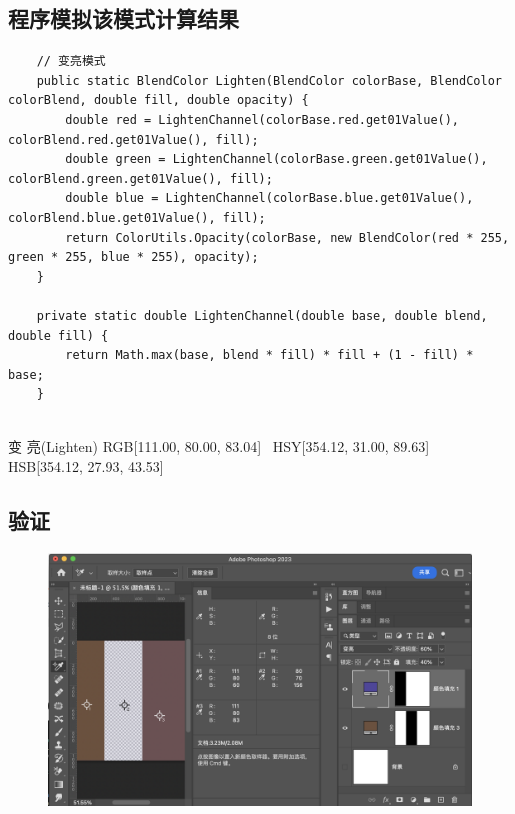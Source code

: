 \subsection{ 程序模拟该模式计算结果}

\begin{lstlisting}
	// 变亮模式
	public static BlendColor Lighten(BlendColor colorBase, BlendColor colorBlend, double fill, double opacity) {
		double red = LightenChannel(colorBase.red.get01Value(), colorBlend.red.get01Value(), fill);
		double green = LightenChannel(colorBase.green.get01Value(), colorBlend.green.get01Value(), fill);
		double blue = LightenChannel(colorBase.blue.get01Value(), colorBlend.blue.get01Value(), fill);
		return ColorUtils.Opacity(colorBase, new BlendColor(red * 255, green * 255, blue * 255), opacity);
	}
	
	private static double LightenChannel(double base, double blend, double fill) {
		return Math.max(base, blend * fill) * fill + (1 - fill) * base;
	}
	
\end{lstlisting}


\begin{result}
\item 变    亮(Lighten)       RGB[111.00,  80.00,  83.04]~ HSY[354.12,  31.00,  89.63]~ HSB[354.12,  27.93,  43.53]
\end{result}

\subsection{ 验证}
\begin{figure}[h!]
	\centering
	\includegraphics[width=\linewidth]{figure/lighten}
	\caption{}
	\label{fig:lighten}
\end{figure}
%
%


